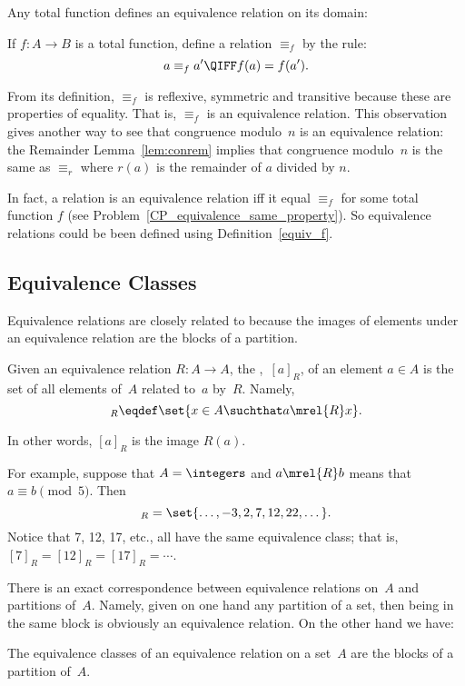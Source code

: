 Any total function defines an equivalence relation on its domain:
\begin{definition}\label{equiv_f}
If $f:A \to B$ is a total function, define a relation $\equiv_f$ by the rule:
\[
a \equiv_f a'  \QIFF f(a) = f(a').
\]
\end{definition}
From its definition, $\equiv_f$ is reflexive, symmetric and transitive
because these are properties of equality.  That is, $\equiv_f$ is an
equivalence relation.  This observation gives another way to see that
congruence modulo~$n$ is an equivalence relation: the Remainder
Lemma~\ref{lem:conrem} implies that congruence modulo~$n$ is the same
as $\equiv_r$ where $r(a)$ is the remainder of $a$ divided by $n$.

In fact, a relation is an equivalence relation iff it equal $\equiv_f$
for some total function $f$ (see
Problem~\ref{CP_equivalence_same_property}).  So equivalence relations
could be been defined using Definition~\ref{equiv_f}.

\subsection{Equivalence Classes}

Equivalence relations are closely related to  because
the images of elements under an equivalence relation are the blocks of
a partition.

\begin{definition}\label{def:equiv_class}
Given an equivalence relation $R : A \to A$, the ,~$[a]_R$, of an element $a \in A$  is the set of all elements of~$A$
related to~$a$ by~$R$.  Namely,
\begin{equation*}
    [a]_R \eqdef \set{x \in A \suchthat a \mrel{R} x}.
\end{equation*}
\end{definition}
In other words, $[a]_R$ is the image $R(a)$.

For example, suppose that $A = \integers$ and $a \mrel{R} b$ means
that $a \equiv b \pmod{5}$.  Then
\begin{equation*}
    [7]_R = \set{\dots, -3, 2, 7, 12, 22, \dots}.
\end{equation*}
Notice that 7, 12, 17, etc., all have the same equivalence class; that
is, $[7]_R = [12]_R = [17]_R = \cdots$.

There is an exact correspondence between equivalence relations on~$A$
and partitions of~$A$.  Namely, given on one hand any partition of a
set, then being in the same block is obviously an equivalence
relation.  On the other hand we have:
\begin{theorem}\label{equiv-partition_thm}
The equivalence classes of an equivalence relation on a set~$A$ are
the blocks of a partition of~$A$.
\end{theorem}

